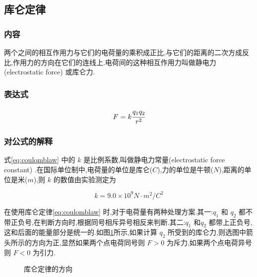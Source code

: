 \subsection{库仑定律}

\subsubsection{内容}
两个之间的相互作用力与它们的电荷量的乘积成正比,与它们的距离的二次方成反比,作用力的方向在它们的连线上.电荷间的这种相互作用力叫做静电力(electrostatic force) 或库仑力.

\subsubsection{表达式}

\begin{equation}
  F=k\cfrac{q_1q_2}{r^2}
  \label{eq:coulomblaw}
\end{equation}

\subsubsection{对公式的解释}

式\eqref{eq:coulomblaw} 中的 $k$ 是比例系数,叫做静电力常量(electrostatic force constant) .在国际单位制中,电荷量的单位是库仑($C$),力的单位是牛顿($N$),距离的单位是米($m$),则 $k$ 的数值由实验测定为

\begin{equation}
  k=9.0\times 10^9 N\cdot m^2/C^2
  \label{eq:coulombconst}
\end{equation}

在使用库仑定律\eqref{eq:coulomblaw} 时,对于电荷量有两种处理方案.其一:$q_1$ 和 $q_2$ 都不带正负号,在判断方向时,根据同号相斥异号相反来判断.其二:$q_1$ 和$q_2$ 都带上正负号,这和后面的能量部分是统一的.如图\ref{fig:coulombdirection}所示,如果计算 $q_2$ 所受到的库仑力,则选图中箭头所示的方向为正,显然如果两个点电荷同号则 $F>0$ 为斥力,如果两个点电荷异号则 $F<0$ 为引力.

\begin{figure}[H]
  \centering
  \caption{库仑定律的方向}
  \label{fig:coulombdirection}
\end{figure}


